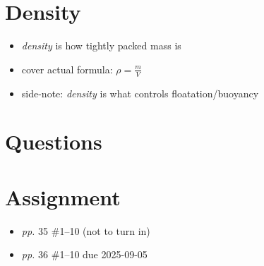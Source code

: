 \documentclass[10pt, oneside]{article}   	%
\begin{document}
\section*{Density}
\begin{itemize}
\item \emph{density} is how tightly packed mass is
\item cover actual formula: $\rho = \frac{m}{V} $
\item side-note: \emph{density} is what controls floatation/buoyancy
\end{itemize}

\section*{Questions}

\section*{Assignment}
\begin{itemize}
\item \emph{pp.} 35 \#1--10 (not to turn in)
\item \emph{pp.} 36 \#1--10 due 2025-09-05
\end{itemize}
\end{document}
